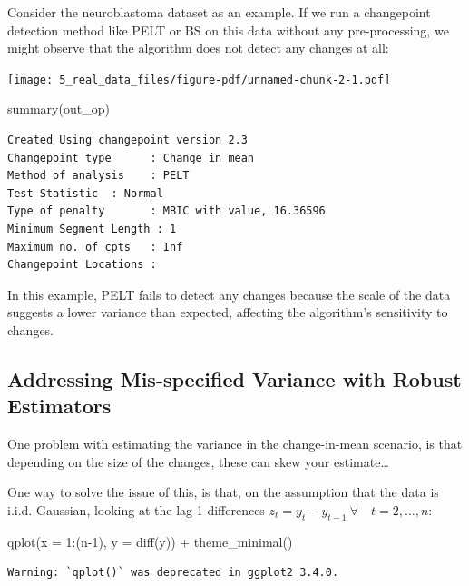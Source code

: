 \documentclass[
  letterpaper,
  DIV=11,
  numbers=noendperiod]{scrreprt}
\newenvironment{Shaded}{\begin{snugshade}}{\end{snugshade}}
\newcommand{\AttributeTok}[1]{\textcolor[rgb]{0.40,0.45,0.13}{#1}}
\newcommand{\DecValTok}[1]{\textcolor[rgb]{0.68,0.00,0.00}{#1}}
\newcommand{\FunctionTok}[1]{\textcolor[rgb]{0.28,0.35,0.67}{#1}}
\newcommand{\NormalTok}[1]{\textcolor[rgb]{0.00,0.23,0.31}{#1}}
\newcommand{\SpecialCharTok}[1]{\textcolor[rgb]{0.37,0.37,0.37}{#1}}
\begin{document}
Consider the neuroblastoma dataset as an example. If we run a
changepoint detection method like PELT or BS on this data without any
pre-processing, we might observe that the algorithm does not detect any
changes at all:

\texttt{[image: 5\_real\_data\_files/figure-pdf/unnamed-chunk-2-1.pdf]}

\begin{Shaded}
\begin{Highlighting}[]
\FunctionTok{summary}\NormalTok{(out\_op)}
\end{Highlighting}
\end{Shaded}

\begin{verbatim}
Created Using changepoint version 2.3 
Changepoint type      : Change in mean 
Method of analysis    : PELT 
Test Statistic  : Normal 
Type of penalty       : MBIC with value, 16.36596 
Minimum Segment Length : 1 
Maximum no. of cpts   : Inf 
Changepoint Locations :  
\end{verbatim}

In this example, PELT fails to detect any changes because the scale of
the data suggests a lower variance than expected, affecting the
algorithm's sensitivity to changes.

\subsection{Addressing Mis-specified Variance with Robust
Estimators}\label{addressing-mis-specified-variance-with-robust-estimators}

One problem with estimating the variance in the change-in-mean scenario,
is that depending on the size of the changes, these can skew your
estimate\ldots{}

One way to solve the issue of this, is that, on the assumption that the
data is i.i.d. Gaussian, looking at the lag-1 differences
\(z_t =  y_t - y_{t-1} \ \forall \quad t = 2, \dots, n\):

\begin{Shaded}
\begin{Highlighting}[]
\FunctionTok{qplot}\NormalTok{(}\AttributeTok{x =} \DecValTok{1}\SpecialCharTok{:}\NormalTok{(n}\DecValTok{{-}1}\NormalTok{), }\AttributeTok{y =} \FunctionTok{diff}\NormalTok{(y)) }\SpecialCharTok{+} \FunctionTok{theme\_minimal}\NormalTok{()}
\end{Highlighting}
\end{Shaded}

\begin{verbatim}
Warning: `qplot()` was deprecated in ggplot2 3.4.0.
\end{verbatim}
\end{document}
